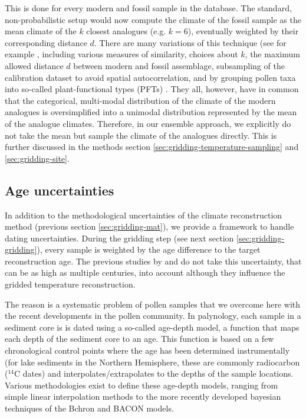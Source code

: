 \begin{refsection}
This is done for every modern and fossil sample in the database. The standard, non-probabilistic setup would now compute the climate of the fossil sample as the mean climate of the $k$ closest analogues (e.g. $k = 6$), eventually weighted by their corresponding distance $d$. There are many variations of this technique (see for example \cite{BirksHeiriSeppaeEtAl2010}, including various measures of similarity\addref, choices about $k$\addref, the maximum allowed distance $d$ between modern and fossil assemblage\addref, subsampling of the calibration dataset to avoid spatial autocorrelation, and by grouping pollen taxa into so-called plant-functional types (PFTs) \citep[e.g.]{DavisBrewerStevensonEtAl2003, MauriDavisCollinsEtAl2015}. They all, however, have in common that the categorical, multi-modal distribution of the climate of the modern analogues is oversimplified into a unimodal distribution represented by the mean of the analogue climates. Therefore, in our ensemble approach, we explicitly do not take the mean but sample the climate of the analogues directly. This is further discussed in the methods section \ref{sec:gridding-temperature-sampling} and \ref{sec:gridding-site}.


\subsection{Age uncertainties}  \label{sec:gridding-ageunc}
In addition to the methodological uncertainties of the climate reconstruction method (previous section \ref{sec:gridding-mat}), we provide a framework to handle dating uncertainties. During the gridding step (see next section \ref{sec:gridding-gridding}), every sample is weighted by the age difference to the target reconstruction age. The previous studies by \cite{DavisBrewerStevensonEtAl2003} and \cite{MauriDavisCollinsEtAl2015} do not take this uncertainty, that can be as high as multiple centuries, into account although they influence the gridded temperature reconstruction.

The reason is a systematic problem of pollen samples that we overcome here with the recent developments in the pollen community. In palynology, each sample in a sediment core is is dated using a so-called age-depth model, a function that maps each depth of the sediment core to an age. This function is based on a few chronological control points where the age has been determined instrumentally (for lake sediments in the Northern Hemisphere, these are commonly radiocarbon ($^{14}$C dates) and interpolates/extrapolates to the depths of the sample locations. Various methodologies exist to define these age-depth models, ranging from simple linear interpolation methods \citep{Bennett1994} to the more recently developed bayesian techniques of the Bchron \citep{HaslettParnell2008} and BACON \citep{BlaauwChristen2011} models.


\end{refsection}

